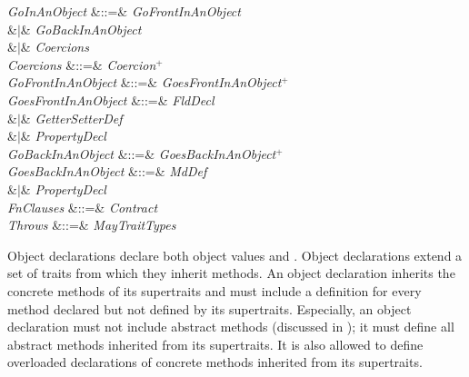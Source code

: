 \begin{Grammar}
\emph{GoInAnObject}
&::=& 
\emph{GoFrontInAnObject} \\
&$|$& 
\emph{GoBackInAnObject} \\
&$|$& \emph{Coercions}\\

\emph{Coercions} &::=& \emph{Coercion}$^+$\\

\emph{GoFrontInAnObject} &::=& \emph{GoesFrontInAnObject}$^+$\\

\emph{GoesFrontInAnObject}
&::=& \emph{FldDecl} \\
&$|$& \emph{GetterSetterDef} \\
&$|$& \emph{PropertyDecl} \\

\emph{GoBackInAnObject} &::=& \emph{GoesBackInAnObject}$^+$\\

\emph{GoesBackInAnObject}
&::=& \emph{MdDef} \\
&$|$& \emph{PropertyDecl} \\

\emph{FnClauses} &::=&  
\emph{Contract} \\

\emph{Throws} &::=&  \emph{MayTraitTypes}\\

\end{Grammar}

Object declarations declare both object values and \objecttypes.
Object declarations extend a
set of traits from which they inherit methods.
An object declaration inherits the
concrete methods of its supertraits and must include a definition for every
method declared but not defined by its supertraits.
Especially, an object declaration must not include abstract methods
(discussed in );
it must define all abstract methods inherited from its supertraits.
It is also allowed to define overloaded declarations of concrete methods
inherited from its supertraits.



